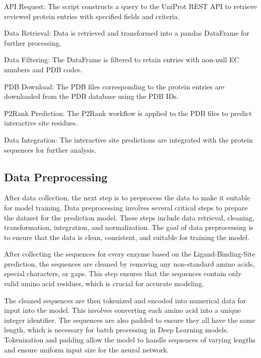 \begin{compactenum}
    \item API Request: The script constructs a query to the UniProt REST API to retrieve reviewed protein entries with specified fields and criteria.
    \item Data Retrieval: Data is retrieved and transformed into a pandas DataFrame for further processing.
    \item Data Filtering: The DataFrame is filtered to retain entries with non-null EC numbers and PDB codes.
    \item PDB Download: The PDB files corresponding to the protein entries are downloaded from the PDB database using the PDB IDs.
    \item P2Rank Prediction: The P2Rank workflow is applied to the PDB files to predict interactive site residues.
    \item Data Integration: The interactive site predictions are integrated with the protein sequences for further analysis.
\end{compactenum}

\subsection{Data Preprocessing}
\label{sec:Data Preprocessing}

After data collection, the next step is to preprocess the data to make it suitable for model training. Data preprocessing involves several critical steps to prepare the dataset for the prediction model. These steps include data retrieval, cleaning, transformation, integration, and normalization. The goal of data preprocessing is to ensure that the data is clean, consistent, and suitable for training the model.

After collecting the sequences for every enzyme based on the Ligand-Binding-Site prediction, the sequences are cleaned by removing any non-standard amino acids, special characters, or gaps. \autocite{OneletterNotationAmino1972} This step ensures that the sequences contain only valid amino acid residues, which is crucial for accurate modeling.

The cleaned sequences are then tokenized and encoded into numerical data for input into the model. This involves converting each amino acid into a unique integer identifier. The sequences are also padded to ensure they all have the same length, which is necessary for batch processing in Deep Learning models. Tokenization and padding allow the model to handle sequences of varying lengths and ensure uniform input size for the neural network. \autocite{dangRepeatedPaddingData2024}

